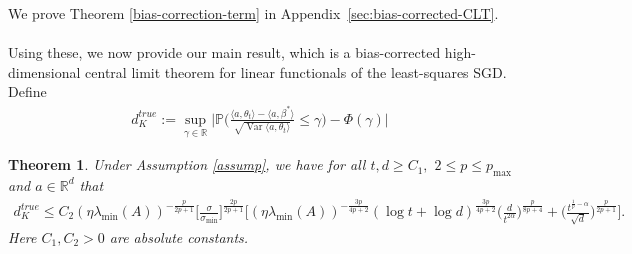 \documentclass[11pt, reqno,english]{amsart}
\DeclareMathOperator{\Var}{Var} \DeclareMathOperator{\N}{N}
\newtheorem{theorem}{Theorem}[section]
\begin{document}
We prove Theorem \ref{bias-correction-term} in Appendix~\ref{sec:bias-corrected-CLT}.
\\\\
Using these, we now provide our main result, which is a bias-corrected 
 high-dimensional central limit theorem for linear functionals of the least-squares SGD. Define
 \begin{align*}
     d^{true}_K := \sup_{\gamma \in \mathbb{R}} \bigg|\mathbb{P}\bigg(\frac{\langle a, \theta_t \rangle - \langle a, \beta^* \rangle}{\sqrt{\Var \langle a, \theta_t \rangle}}\leq \gamma\bigg) - \Phi(\gamma)\bigg| 
 \end{align*}

\begin{theorem}\label{th-1-bias-corrected}
Under Assumption \ref{assump}, we have for all $t,d \geq C_1,$ $2 \leq p \leq p_{\max}$ and $a \in \mathbb{R}^d$ that
\begin{align}\label{maineq}
     d^{true}_K\leq C_2(\eta \lambda_{\min}(A))^{-\frac{p}{2p+1}}\Big[\frac{\sigma}{\sigma_{\min}}\Big]^{\frac{2p}{2p+1}}\bigg[(\eta \lambda_{\min}(A))^{-\frac{3p}{4p+2}}(\log t + \log d)^{\frac{3p}{4p+2}}\Big(\frac{d}{t^{2\alpha}}\Big)^{\frac{p}{8p+4}} + \Big(\frac{t^{\frac{1}{p}-\alpha}}{\sqrt{d}}\Big)^{\frac{p}{2p+1}}\bigg].
\end{align}
Here $C_1, C_2 > 0$ are absolute constants. 
\end{theorem}
\end{document}
